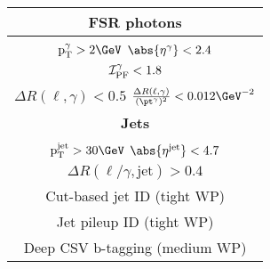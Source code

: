 \begin{table}[H]
\begin{tabular}{|c|c|}
		\multicolumn{2}{|c|}{\textbf{FSR photons}}                                                                                                                                                                                  \\ \hline
		\multicolumn{2}{|c|}{$\mathrm{p_T^{\gamma}} > 2 \GeV$ \hspace{0.5cm} $\abs{\eta^{\gamma}} < 2.4$}                                                                                                                                 \\
		\multicolumn{2}{|c|}{$\ensuremath{{\cal I}_{\mathrm{PF}}^{\gamma}} < 1.8$}                                                                                                                                         \\
		\multicolumn{2}{|c|}{$\Delta R(\ell,\gamma) < 0.5$ \hspace{0.5cm} $\frac{\Delta R(\ell,\gamma)}{(\pt^{\gamma})^2} < 0.012 \GeV^{-2}$}                                                                                             \\ \hline \hline
		\multicolumn{2}{|c|}{\textbf{Jets}}                                                                                                                                                                                         \\ \hline
		\multicolumn{2}{|c|}{$\mathrm{p_T^{\mathrm{jet}}} > 30 \GeV$ \hspace{0.5cm} $\abs{\eta^{\mathrm{jet}}} < 4.7$}                                                                                                                    \\
		\multicolumn{2}{|c|}{$\Delta R(\ell/\gamma, \mathrm{jet}) > 0.4$} \\
                \multicolumn{2}{|c|}{Cut-based jet ID (tight WP) } \\
                \multicolumn{2}{|c|}{Jet pileup ID (tight WP)} \\
                \multicolumn{2}{|c|}{Deep CSV b-tagging (medium WP)} \\
                \hline \hline

\end{tabular}
\end{table}
